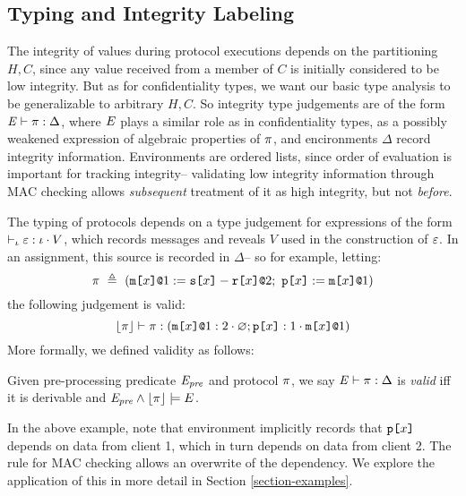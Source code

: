 \subsection{Typing and Integrity Labeling}

\ipjfig

The integrity of values during protocol executions depends on the
partitioning $H,C$, since any value received from a member of
$C$ is initially considered to be low integrity. But as for
confidentiality types, we want our basic type analysis to be
generalizable to arbitrary $H,C$. So integrity type judgements are of the form
$\mathit{E} \vdash \pi : \Delta$, where $\mathit{E}$ plays a similar role as in
confidentiality types, as a possibly weakened expression of algebraic
properties of $\pi$, and encironments $\Delta$ record integrity
information. Environments are ordered lists, since order of evaluation
is important for tracking integrity-- validating low
integrity information through MAC checking allows \emph{subsequent}
treatment of it as high integrity, but not \emph{before}.

The typing of protocols depends on a type judgement for expressions
of the form $\vdash_{\iota} \varepsilon : \iota \cdot V$, which records
messages and reveals $V$ used in the construction of $\varepsilon$.
In an assignment, this source is recorded in $\Delta$-- so for
example, letting:
$$
\prog\ \defeq\ (\xassign{\mx{x}{1}}{\secret{x} - \flip{x}}{2};\ \rvl{x} := \mx{x}{1})
$$
the following judgement is valid:
$$
\lfloor \pi \rfloor \vdash \pi : (\texttt{m[}x\texttt{]}\texttt{@}1 : 2 \cdot \varnothing; \texttt{p[}x\texttt{]} : 1 \cdot \texttt{m[}x\texttt{]}\texttt{@}1)
$$
More formally, we defined validity as follows:
\begin{definition}
  Given pre-processing predicate $\mathit{E}_{\mathit{pre}}$ and protocol $\pi$, 
  we say $\mathit{E} \vdash \pi : \Delta$ is \emph{valid}
  iff it is derivable and $\mathit{E}_{\mathit{pre}} \wedge \lfloor \pi \rfloor \models E$.
\end{definition}

In the above example, note that environment implicitly records
that $\texttt{p[}x\texttt{]}$ depends on data from client 1, which in turn
depends on data from client 2. The rule for MAC
checking allows an overwrite of the dependency. We explore
the application of this in more detail in Section
\ref{section-examples}.

\cheatjfig

